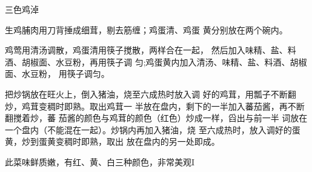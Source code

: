 \begin{recipe}{三色鸡淖}

\ingredients


\cooking

\step 生鸡脯肉用刀背捶成细茸，剔去筋缠；鸡蛋清、鸡蛋 黄分别放在两个碗内。

\step 鸡莺用清汤调散，鸡蛋清用筷子搅散，两样合在一起， 然后加入味精、盐、料酒、胡椒面、水豆粉，再用筷子调 匀;鸡蛋黄内加入清汤、味精、盐、料酒、胡椒面、水豆粉， 用筷子调匀。

\step 把炒锅放在旺火上，倒入猪油，烧至六成热时放入调 好的鸡茸，用瓢子不断翻炒，鸡茸变稠时即熟。取出鸡茸一 半放在盘内，剩下的一半加入蕃茄酱，再不断翻搅着炒，蕃 茄酱的颜色与鸡茸的颜色（红色）炒成一样，舀出与前一半 词放在一个盘内（不能混在一起）。炒锅内再加入猪油，烧 至六成热时，放入调好的蛋黄，炒到蛋黄变稠时即熟，取出 放在盘内的另一处即成。

\notes

此菜味鲜质嫩，有红、黄、白三种颜色，非常美观I

\end{recipe}

